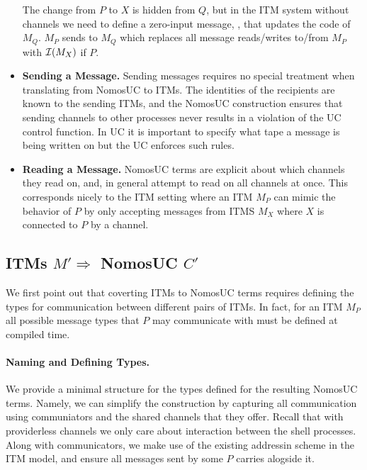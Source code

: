 \begin{itemize}
		The change from $P$ to $X$ is hidden from $Q$, but in the ITM system without channels we need to define a zero-input message, , that updates the code of $M_Q$. 
		$M_P$ sends  to $M_Q$ which replaces all message reads/writes to/from $M_P$ with $\mathcal{I}(M_X)$ if $P$.
	\item {\bf Sending a Message.} 
		Sending messages requires no special treatment when translating from NomosUC to ITMs. The identities of the recipients are known to the sending ITMs, and the NomosUC construction ensures that sending channels to other processes never results in a violation of the UC control function.
		In UC it is important to specify what tape a message is being written on but the UC \cf enforces such rules.
	\item {\bf Reading a Message.} 
		NomosUC terms are explicit about which channels they read on, and, in general attempt to read on all channels at once. This corresponds nicely to the ITM setting where an ITM $M_P$ can mimic the behavior of $P$ by only accepting messages from ITMS $M_X$ where $X$ is connected to $P$ by a channel. 
\end{itemize}

\subsection{ITMs $M' \Rightarrow$ NomosUC $C'$}
We first point out that coverting ITMs to NomosUC terms requires defining the types for communication between different pairs of ITMs.
In fact, for an ITM $M_P$ all possible message types that $P$ may communicate with must be defined at compiled time. 

\paragraph{Naming and Defining Types.}
We provide a minimal structure for the types defined for the resulting NomosUC terms.
Namely, we can simplify the construction by capturing all communication using communiators and the shared channels that they offer. 
Recall that with providerless channels we only care about interaction between the shell processes. 
Along with communicators, we make use of the existing addressin scheme in the ITM model, and ensure all messages sent by some $P$ carries  alogside it.

